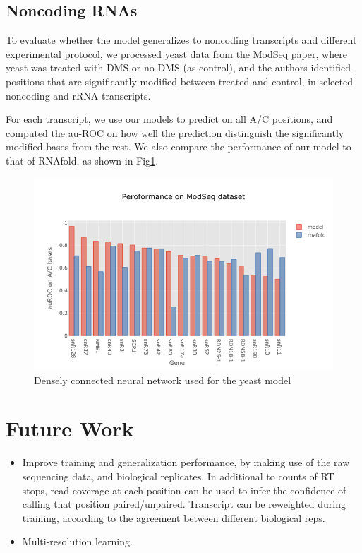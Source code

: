 \documentclass{proposal}
\begin{document}
\subsection{Noncoding RNAs}

To evaluate whether the model generalizes to noncoding transcripts and different experimental protocol,
we processed yeast data from the ModSeq paper\cite{talkish2014mod},
where yeast was treated with DMS or no-DMS (as control),
and the authors identified positions that are significantly modified between treated and control,
in selected noncoding and rRNA transcripts.

For each transcript, we use our models to predict on all A/C positions,
and computed the au-ROC on how well the prediction distinguish the significantly modified bases from the rest.
We also compare the performance of our model to that of RNAfold, as shown in Fig\ref{fig:yeast_modseq_performance}.

\begin{figure}[h!]
\includegraphics[width=\textwidth]{yeast_modseq_performance.png}
\caption{Densely connected neural network used for the yeast model}
\label{fig:yeast_modseq_performance}
\centering
\end{figure}


\section{Future Work}

\begin{itemize}
  \item Improve training and generalization performance, by making use of the raw sequencing data, and biological replicates.
  In additional to counts of RT stops, read coverage at each position can be used to infer the confidence of calling that position paired/unpaired.
  Transcript can be reweighted during training, according to the agreement between different biological reps.

  \item Multi-resolution learning.
\end{itemize}
\end{document}

